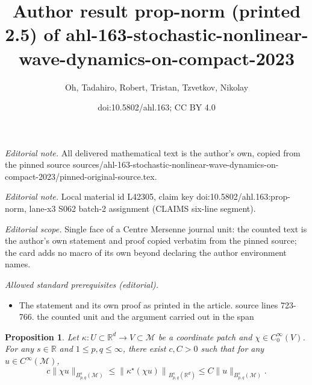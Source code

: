 \documentclass[10pt,a4paper]{article}
\title{Author result prop-norm (printed 2.5) of ahl-163-stochastic-nonlinear-wave-dynamics-on-compact-2023}
\author{Oh, Tadahiro, Robert, Tristan, Tzvetkov, Nikolay}
\date{doi:10.5802/ahl.163; CC BY 4.0}
\newtheorem{prop}{Proposition}[section]
\newcommand{\R}{\mathbb{R}}
\newcommand{\M}{\mathcal{M}}
\newcommand{\kk}{\kappa}
\begin{document}
\maketitle
\noindent\textit{Editorial note.} All delivered mathematical text is the author's own, copied from the pinned source sources/ahl-163-stochastic-nonlinear-wave-dynamics-on-compact-2023/pinned-original-source.tex.\par\medskip
\noindent\textit{Editorial note.} Local material id L42305, claim key doi:10.5802/ahl.163:prop-norm, lane-x3 S062 batch-2 assignment (CLAIMS six-line segment).\par\medskip
\noindent\textit{Editorial scope.} Single face of a Centre Mersenne journal unit: the counted text is the author's own statement and proof copied verbatim from the pinned source; the card adds no macro of its own beyond declaring the author environment names.\par\medskip
\noindent\textit{Allowed standard prerequisites (editorial).}\begin{itemize}
\item The statement and its own proof as printed in the article. source lines 723-766. the counted unit and the argument carried out in the span
\end{itemize}\medskip
\begin{prop}\label{prop-norm}
Let $\kk: U\subset \R^d\rightarrow V\subset\M$ be a coordinate patch and $\chi\in C^{\infty}_0(V)$. For any $s\in\R$ and $1\leq p,q\leq \infty$, there exist $c,C>0$ such that for any $u\in C^{\infty}(\M)$,
\begin{equation}\label{equiv-norm}
c\|\chi u\|_{B^s_{p,q}(\M)}\leq \left\|\kk^{\star}(\chi u)\right\|_{B^{s}_{p,q}(\R^d)}\leq C\|u\|_{B^s_{p,q}(\M)}.
\end{equation}
\end{prop}
\end{document}
